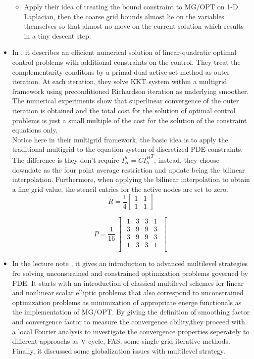 \documentclass{article}
\begin{document}
\begin{itemize}
\begin{itemize}
\item Apply their idea of treating the bound constraint to MG/OPT on 1-D Laplacian, then the coarse grid bounds almost lie on the variables themselves so that almost no move on the current solution which results in a tiny descent step. 
\end{itemize}


\item In \cite{M3}, it describes an efficient numerical solution of linear-quadratic optimal control problems with additional constraints on the control. They treat the complementarity conditons by a primal-dual active-set method as outer iteration. At each iteration, they solve KKT system  within a multigrid framework using preconditioned Richardson iteration as underlying smoother. The numerical experiments show that superlinear convergence of the outer iteration is obtained and the total cost for the solution of optimal control problems is just a small multiple of the cost for the solution of the constraint equations only.\\

Notice here in their multigrid framework, the basic idea is to apply the traditional multigrid to the equation system of discretized PDE constraints. The difference is they don't require $I_H^h =C {I_{h}^H}^T $, instead, they choose downdate as the four point average restriction and update being the bilinear interpolation. Furthermore, when applying the bilinear interpolation to obtain a fine grid value, the stencil entries for the active nodes are set to zero. 
\[  R=\frac{1}{4} \left [ \begin{array}{ll} 
 1 & 1 \\
1 & 1 \end{array}\right ]   \]

\[  P=\frac{1}{16} \left] \begin{array}{llll} 
 1 & 3 & 3 & 1\\
 3 & 9 & 9 & 3\\
 3 & 9 & 9 & 3\\
 1 & 3 & 3 & 1\\
 \end{array}\right [   \]

\item In the lecture note \cite{AL1}, it gives an introduction to advanced multilevel strategies fro solving unconstrained and constrained optimization problems governed by PDE. It starts with an introduction of classical multilevel schemes for linear and nonlinear scalar elliptic problems that also correspond to unconstrained optimization problems as minimization of appropriate energe functionals as the implementation of MG/OPT.  By giving the definition of smoothing factor and convergence factor to measure the convergence ability,they proceed with a local Fourier analysis to investigate the convergence properties seperately to different approachs as V-cycle, FAS, some single grid iterative methods. Finally, it discussed some globalization issues with multilevel strategy.


\end{itemize}
\end{document}

